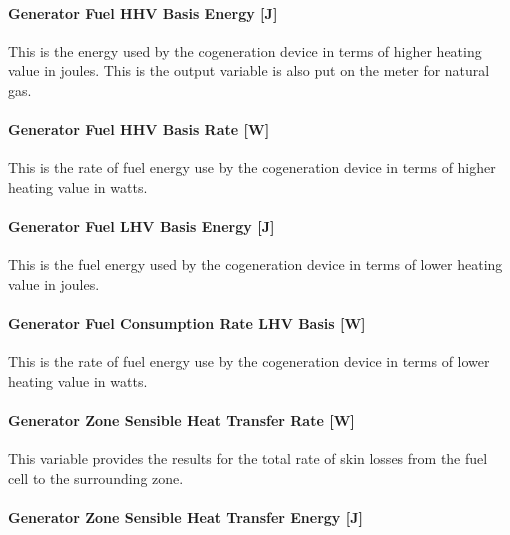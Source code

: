 \paragraph{Generator Fuel HHV Basis Energy {[}J{]}}\label{generator-fuel-hhv-basis-energy-j-3}

This is the energy used by the cogeneration device in terms of higher heating value in joules. This is the output variable is also put on the meter for natural gas.

\paragraph{Generator Fuel HHV Basis Rate {[}W{]}}\label{generator-fuel-hhv-basis-rate-w-3}

This is the rate of fuel energy use by the cogeneration device in terms of higher heating value in watts.

\paragraph{Generator Fuel LHV Basis Energy {[}J{]}}\label{generator-fuel-lhv-basis-energy-j-1}

This is the fuel energy used by the cogeneration device in terms of lower heating value in joules.

\paragraph{Generator Fuel Consumption Rate LHV Basis {[}W{]}}\label{generator-fuel-consumption-rate-lhv-basis-w}

This is the rate of fuel energy use by the cogeneration device in terms of lower heating value in watts.

\paragraph{Generator Zone Sensible Heat Transfer Rate {[}W{]}}\label{generator-zone-sensible-heat-transfer-rate-w-1}

This variable provides the results for the total rate of skin losses from the fuel cell to the surrounding zone.

\paragraph{Generator Zone Sensible Heat Transfer Energy {[}J{]}}\label{generator-zone-sensible-heat-transfer-energy-j-1}

